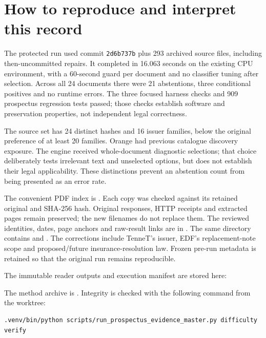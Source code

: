 \section{How to reproduce and interpret this record}

The protected run used commit \texttt{2d6b737b} plus 293 archived source files,
including then-uncommitted repairs. It completed in 16.063 seconds on the
existing CPU environment, with a 60-second guard per document and no
classifier tuning after selection. Across all 24 documents there were
21 abstentions, three conditional positives and no runtime errors. The
three focused harness checks and 909 prospectus regression tests passed;
those checks establish software and preservation properties, not independent
legal correctness.

The source set has 24 distinct hashes and 16 issuer families, below the
original preference of at least 20 families. Orange had previous catalogue
discovery exposure. The engine received whole-document diagnostic selections;
that choice deliberately tests irrelevant text and unselected options, but
does not establish their legal applicability. These distinctions prevent an
abstention count from being presented as an error rate.

The convenient PDF index is
.
Each copy was checked against its retained original and SHA-256 hash.
Original responses, HTTP receipts and extracted pages remain preserved;
the new filenames do not replace them. The reviewed identities, dates,
page anchors and raw-result links are in
.
The same directory contains  and
. The corrections include TenneT's issuer, EDF's
replacement-note scope and proposed/future insurance-resolution law.
Frozen pre-run metadata is retained so that the original run remains
reproducible.

The immutable reader outputs and execution manifest are stored here:
\begin{quote}\small
{}
\end{quote}
The method archive is .
Integrity is checked with the following command from the worktree:

\begin{lstlisting}
.venv/bin/python scripts/run_prospectus_evidence_master.py difficulty verify
\end{lstlisting}

